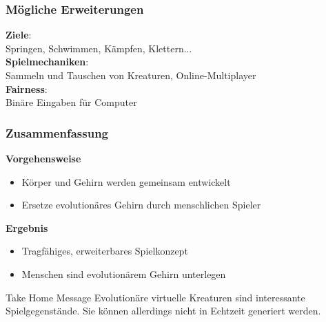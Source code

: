 \documentclass{beamer}
\begin{document}
\begin{frame}
	\frametitle{Mögliche Erweiterungen}
	
	\textbf{Ziele}:\\ Springen, Schwimmen, Kämpfen, Klettern... \\
	\vspace{2em}
	\textbf{Spielmechaniken}:\\ Sammeln und Tauschen von Kreaturen, Online-Multiplayer \\
	\vspace{2em}
	\textbf{Fairness}:\\ Binäre Eingaben für Computer
\end{frame}

\begin{frame}
	\frametitle{Zusammenfassung}
	\pause
	\textbf{Vorgehensweise}
	\begin{itemize}
		\item Körper und Gehirn werden gemeinsam entwickelt \pause
		\item Ersetze evolutionäres Gehirn durch menschlichen Spieler \pause
	\end{itemize}
	\vspace{1em}
	\textbf{Ergebnis}
	\begin{itemize}
		\item Tragfähiges, erweiterbares Spielkonzept \pause
		\item Menschen sind evolutionärem Gehirn unterlegen \pause
	\end{itemize}
	\vspace{1em}
	\begin{block}{Take Home Message}
		Evolutionäre virtuelle Kreaturen sind interessante Spielgegenstände. Sie können allerdings nicht in Echtzeit generiert werden.
	\end{block}
	
\end{frame}
\end{document}
